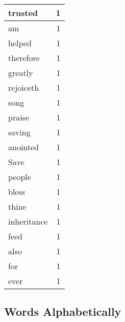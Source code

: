 \begin{center}
\begin{longtable}{l|r}
trusted & 1 \\ \hline
am & 1 \\ \hline
helped & 1 \\ \hline
therefore & 1 \\ \hline
greatly & 1 \\ \hline
rejoiceth & 1 \\ \hline
song & 1 \\ \hline
praise & 1 \\ \hline
saving & 1 \\ \hline
anointed & 1 \\ \hline
Save & 1 \\ \hline
people & 1 \\ \hline
bless & 1 \\ \hline
thine & 1 \\ \hline
inheritance & 1 \\ \hline
feed & 1 \\ \hline
also & 1 \\ \hline
for & 1 \\ \hline
ever & 1 \\ \hline
\end{longtable}
\end{center}



\normalsize



\subsection{Words Alphabetically}

